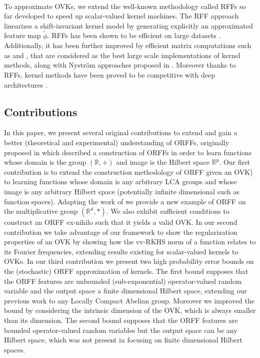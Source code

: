 \documentclass[twoside,11pt]{article}
\begin{document}
\paragraph{}
To approximate \acsp{OVK}, we extend the well-known methodology called
\acfp{RFF} \citep{Rahimi2007, Le2013, Yang2015, sriper2015, Bach2015,
sutherland2015, rudi2016generalization} so far developed to speed up
scalar-valued kernel machines. The \acs{RFF} approach linearizes a
shift-invariant kernel model by generating explicitly an approximated feature
map $\tilde{\phi}$. \acsp{RFF} has been shown to be efficient on large datasets
\citep{rudi2016generalization}.  Additionally, it has been further improved by
efficient matrix computations such as \citep[``FastFood'']{Le2013} and
\citep[``SORF'']{felix2016orthogonal}, that are considered as the best large
scale implementations of kernel methods, along with Nystr\"om approaches
proposed in \citet{drineas2005nystrom}. Moreover thanks to \acsp{RFF}, kernel
methods have been proved to be competitive with deep architectures
\citep{lu2014scale, dai2014scalable, yang2015deep}.

\subsection{Contributions}
In this paper, we present  several original
contributions to extend and gain a better (theoretical and experimental)
understanding of \acp{ORFF}, originally proposed in  \citet{brault2016random} which described a construction of \acp{ORFF} in
order to learn functions whose domain is the group $(\mathbb{R}, +)$ and image
is the Hilbert space $\mathbb{R}^p$. Our first contribution is to extend the construction methodology of
\acs{ORFF} given an \acs{OVK}) to learning functions whose domain is any arbitrary \acl{LCA} groups and
whose image is any arbitrary Hilbert space (potentially infinite dimensional
such as function spaces). Adapting the work of \citet{li2010random} we provide a new example of \acs{ORFF} on the
multiplicative group $(\mathbb{R}^d, *)$. We also exhibit sufficient conditions
to construct an \acs{ORFF} ex-nihilo such that it yields a valid \acs{OVK}. 
In our second contribution we
take advantage of our framework to show the regularization properties of an
\acs{OVK} by showing how the \acs{vv-RKHS} norm of a function relates to its
Fourier frequencies, extending results existing for scalar-valued kernels to
\acsp{OVK}.  In our third contribution we present two high probability error bounds on the (stochastic)
\acs{ORFF} approximation of kernels. The first bound supposes that the
\acs{ORFF} features are unbounded (sub-exponential) operator-valued random
variable and the output space a finite dimensional Hilbert space, extending our
previous work \citep{brault2016random} to any Locally Compact Abelian group. Moreover we
improved the bound by considering the intrinsic dimension of the \acs{OVK},
which is always smaller than its dimension. The second bound supposes that the
\acs{ORFF} features are bounded operator-valued random variables but the output
space can be any Hilbert space, which was not present in
\citet{brault2016random} focusing on finite dimensional Hilbert spaces.
\end{document}
